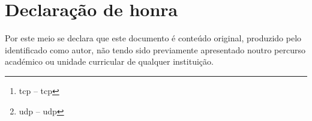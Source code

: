 \begin{abstract}
    \label{resumo}
    
    Este relatório descreve a descrição da elaboraboração de uma extensão de controlo
    de portas \acrshort{tcp}\footnote{\acrshort{tcp} -- \acrlong{tcp}}/\acrshort{udp}\footnote{\acrshort{udp} -- \acrlong{udp}} de \textit{containers} que poderá ser integrada na plataforma 
    Forge (DevLab do IPMAIA/UMAIA).
    Os principais vantagens desta extensão consistem aumentar a segurança através do 
    controlo de serviços que são 
    disponiblizados pelos \textit{containers}, facilitar as ações do administrador do 
    sistema que envolvem o controlo de portas através de uma interface web.
    \\
    \\
    \\
    \textbf{Expressões-chave:} Extensão. Controlo de portas \acrshort{tcp}/\acrshort{udp}. \textit{Containers}. Segurança.
    
    \end{abstract}
    
    
    \begin{abstract}
    \label{abstract}
    This report describes the development of an plugin for controlling \acrshort{tcp}/\acrshort{udp} 
    ports of containers that can be integrated into the Forge platform (DevLab of 
    IPMAIA/UMAIA). The main advantages of this extension are increasing security by 
    controlling the services provided by the containers, and facilitating the system 
    administrator's tasks involving port control through a web interface.
     \\
     \\
     \\
     \textbf{Key-expressions:} \textit{Plugin. Controlling \acrshort{tcp}/\acrshort{udp} ports. Containers. Security.}
     
     
    \end{abstract}
    
    
    \chapter*{Declaração de honra}
    \label{way_of_the_samurai}
    Por este meio se declara que este documento é conteúdo original, produzido pelo identificado como autor, não tendo sido previamente apresentado noutro percurso académico ou unidade curricular de qualquer instituição.
    
